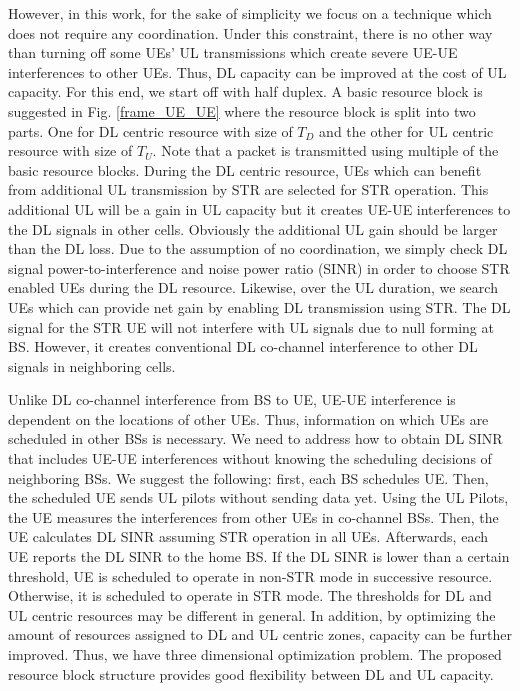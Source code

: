 \documentclass[twocolumn]{IEEEtran}
\begin{document}
However, in this work, for the sake of simplicity we focus on a
technique which does not require any coordination. Under this
constraint, there is no other way than turning off some UEs' UL
transmissions which create severe UE-UE interferences to other UEs.
Thus, DL capacity can be improved at the cost of UL capacity. For
this end, we start off with half duplex. A basic resource block is
suggested in Fig. \ref{frame_UE_UE} where the resource block is
split into two parts. One for DL centric resource with size of $T_D$
and the other for UL centric resource with size of $T_U$. Note that
a packet is transmitted using multiple of the basic resource blocks.
During the DL centric resource, UEs which can benefit from
additional UL transmission by STR are selected for STR operation.
This additional UL will be a gain in UL capacity but it creates
UE-UE interferences to the DL signals in other cells. Obviously the
additional UL gain should be larger than the DL loss. Due to the
assumption of no coordination, we simply check DL signal
power-to-interference and noise power ratio (SINR) in order to
choose STR enabled UEs during the DL resource. Likewise, over the UL
duration, we search UEs which can provide net gain by enabling DL
transmission using STR. The DL signal for the STR UE will not
interfere with UL signals due to null forming at BS. However, it
creates conventional DL co-channel interference to other DL signals
in neighboring cells.


Unlike DL co-channel interference from BS to UE, UE-UE interference
is dependent on the locations of other UEs. Thus, information on
which UEs are scheduled in other BSs is necessary. We need to
address how to obtain DL SINR that includes UE-UE interferences
without knowing the scheduling decisions of neighboring BSs. We
suggest the following: first, each BS schedules UE. Then, the
scheduled UE sends UL pilots without sending data yet. Using the UL
Pilots, the UE measures the interferences from other UEs in
co-channel BSs. Then, the UE calculates DL SINR assuming STR
operation in all UEs. Afterwards, each UE reports the DL SINR to the
home BS. If the DL SINR is lower than a certain threshold, UE is
scheduled to operate in non-STR mode in successive resource.
Otherwise, it is scheduled to operate in STR mode. The thresholds
for DL and UL centric resources may be different in general. In
addition, by optimizing the amount of resources assigned to DL and
UL centric zones, capacity can be further improved. Thus, we have
three dimensional optimization problem. The proposed resource block
structure provides good flexibility between DL and UL capacity.
\end{document}
